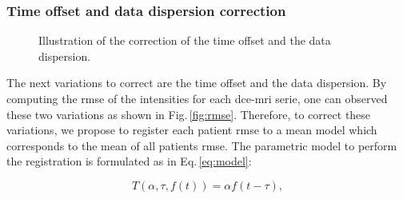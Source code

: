 \subsubsection{Time offset and data dispersion correction}

\begin{figure}
  \centering
  \hspace*{\fill}
   \hfill
  \hspace*{\fill}
  \caption{Illustration of the correction of the time offset and the data dispersion.}
  \label{fig:curveal}
\end{figure}

The next variations to correct are the time offset and the data dispersion.
By computing the \ac{rmse} of the intensities for each \ac{dce}-\ac{mri} serie, one can observed these two variations as shown in Fig.\,\ref{fig:rmse}.
Therefore, to correct these variations, we propose to register each patient \ac{rmse} to a mean model which corresponds to the mean of all patients \ac{rmse}.
The parametric model to perform the registration is formulated as in Eq.\,\eqref{eq:model}:

\begin{equation}
  T(\alpha, \tau, f(t)) = \alpha f(t - \tau) ,
  \label{eq:model}
\end{equation}


